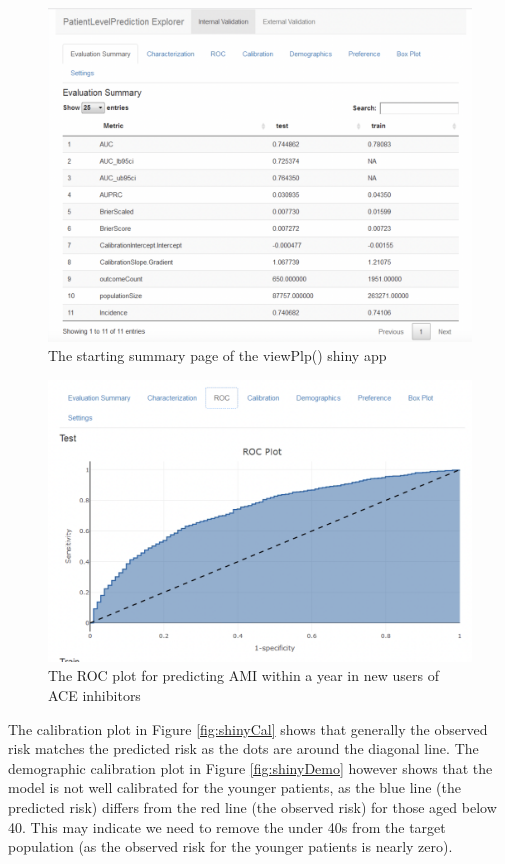 \documentclass[11pt]{book}
\theoremstyle{definition}
\theoremstyle{definition}
\theoremstyle{definition}
\theoremstyle{remark}
\begin{document}
\begin{figure}

{\centering \includegraphics[width=0.8\linewidth]{images/PatientLevelPrediction/shiny/singleShiny/singleShinySummary} 

}

\caption{The starting summary page of the viewPlp() shiny app}\label{fig:shinySum}
\end{figure}

\begin{figure}

{\centering \includegraphics[width=0.8\linewidth]{images/PatientLevelPrediction/shiny/singleShiny/singleShinyRoc} 

}

\caption{The ROC plot for predicting AMI within a year in new users of ACE inhibitors}\label{fig:shinyROC}
\end{figure}

The calibration plot in Figure \ref{fig:shinyCal} shows that generally the observed risk matches the predicted risk as the dots are around the diagonal line. The demographic calibration plot in Figure \ref{fig:shinyDemo} however shows that the model is not well calibrated for the younger patients, as the blue line (the predicted risk) differs from the red line (the observed risk) for those aged below 40. This may indicate we need to remove the under 40s from the target population (as the observed risk for the younger patients is nearly zero).
\end{document}
